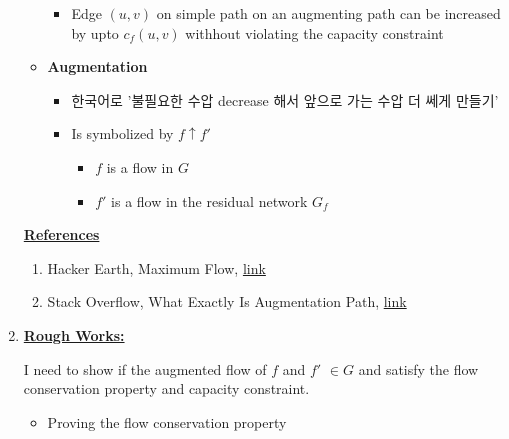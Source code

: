 \documentclass[12pt]{article}
\begin{document}
\begin{enumerate}[1.]
\begin{itemize}
\begin{itemize}
            \item Edge $(u,v)$ on simple path on an augmenting path can be increased
            by upto $c_f(u,v)$ withhout violating the capacity constraint
        \end{itemize}

        \item \textbf{Augmentation}

        \begin{itemize}
            \item 한국어로 '불필요한 수압 decrease 해서 앞으로 가는 수압 더 쎄게 만들기'
            \item Is symbolized by $f \uparrow f'$

            \begin{itemize}
                \item $f$ is a flow in $G$
                \item $f'$ is a flow in the residual network $G_f$
            \end{itemize}
        \end{itemize}

    \end{itemize}

    \bigskip

    \underline{\textbf{References}}

    \bigskip

    \begin{enumerate}[1)]
        \item Hacker Earth, Maximum Flow, \href{https://www.hackerearth.com/practice/algorithms/graphs/maximum-flow/tutorial/}{link}
        \item Stack Overflow, What Exactly Is Augmentation Path, \href{https://stackoverflow.com/questions/10397118/what-exactly-is-augmenting-path}{link}
    \end{enumerate}

    \item

    \bigskip

    \underline{\textbf{Rough Works:}}

    \bigskip

    I need to show if the augmented flow of $f$ and $f'$ $\in G$ and satisfy the
    flow conservation property and capacity constraint.

    \bigskip

    \begin{itemize}
        \item Proving the flow conservation property


\end{itemize}
\end{enumerate}
\end{document}
